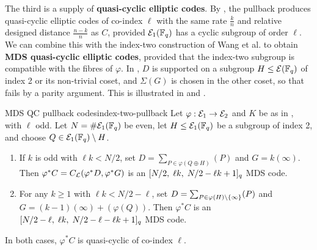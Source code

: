 \documentclass[twocolumn, 11pt]{scrartcl}
\begin{document}
The third is a supply of \textbf{quasi-cyclic elliptic codes}. By , the pullback produces quasi-cyclic elliptic codes of co-index $\ell$ with the same rate $\frac kn$ and relative designed distance $\frac{n-k}{n}$ as $C$, provided $\mathcal{E}_1(\mathbb{F}_q)$ has a cyclic subgroup of order $\ell$. We can combine this with the index-two construction of Wang et al. \cite{wang2025nonrs} to obtain \textbf{MDS quasi-cyclic elliptic codes}, provided that the index-two subgroup is compatible with the fibres of $\varphi$. In \cite{wang2025nonrs}, $D$ is supported on a subgroup $H\leq\mathcal{E}(\mathbb{F}_q)$ of index 2 or its non-trivial coset, and $\Sigma(G)$ is chosen in the other coset, so that  fails by a parity argument. This is illustrated in  and .

\begin{construction}{MDS QC pullback codes}{index-two-pullback}
    Let $\varphi:\mathcal{E}_1\to\mathcal{E}_2$ and $K$ be as in , with $\ell$ odd. Let $N=\#\mathcal{E}_1(\mathbb{F}_q)$ be even, let $H\leq\mathcal{E}_1(\mathbb{F}_q)$ be a subgroup of index 2, and choose $Q\in\mathcal{E}_1(\mathbb{F}_q)\setminus H$.
    \begin{enumerate}
        \item \label{enum:index-two-pullback-odd} If $k$ is odd with $\ell k<N/2$, set $D=\sum_{P\in\varphi(Q\oplus H)}(P)$ and $G=k(\infty)$. Then $\varphi^*C=C_\mathcal{L}(\varphi^*D,\varphi^*G)$ is an $[N/2,\;\ell k,\;N/2-\ell k+1]_q$ MDS code.
        \item \label{enum:index-two-pullback-any} For any $k\geq1$ with $\ell k<N/2-\ell$, set $D=\sum_{P\in\varphi(H)\setminus\{\infty\}}(P)$ and $G=(k-1)(\infty)+(\varphi(Q))$. Then $\varphi^*C$ is an $[N/2-\ell,\;\ell k,\;N/2-\ell-\ell k+1]_q$ MDS code.
    \end{enumerate}
    In both cases, $\varphi^*C$ is quasi-cyclic of co-index $\ell$.
\end{construction}
\end{document}
